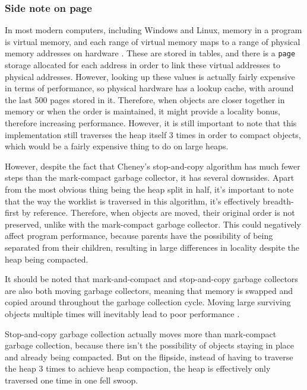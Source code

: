 \documentclass[index]{subfiles}
\begin{document}
\subsubsection{Side note on page}

In most modern computers, including Windows and Linux, memory in a program is virtual memory, and each range of virtual memory maps to a range of physical memory addresses on hardware \cite{code_project}. These are stored in tables, and there is a \verb+page+ storage allocated for each address in order to link these virtual addresses to physical addresses. However, looking up these values is actually fairly expensive in terms of performance, so physical hardware has a lookup cache, with around the last 500 pages stored in it. Therefore, when objects are closer together in memory or when the order is maintained, it might provide a locality bonus, therefore increasing performance. However, it is still important to note that this implementation still traverses the heap itself 3 times in order to compact objects, which would be a fairly expensive thing to do on large heaps.

However, despite the fact that Cheney's stop-and-copy algorithm has much fewer steps than the mark-compact garbage collector, it has several downsides. Apart from the most obvious thing being the heap split in half, it's important to note that the way the worklist is traversed in this algorithm, it's effectively breadth-first by reference. Therefore, when objects are moved, their original order is not preserved, unlike with the mark-compact garbage collector. This could negatively affect program performance, because parents have the possibility of being separated from their children, resulting in large differences in locality despite the heap being compacted.

It should be noted that mark-and-compact and stop-and-copy garbage collectors are also both moving garbage collectors, meaning that memory is swapped and copied around throughout the garbage collection cycle. Moving large surviving objects multiple times will inevitably lead to poor performance \cite[Chapter~4]{gc_handbook}.

Stop-and-copy garbage collection actually moves more than mark-compact garbage collection, because there isn't the possibility of objects staying in place and already being compacted. But on the flipside, instead of having to traverse the heap 3 times to achieve heap compaction, the heap is effectively only traversed one time in one fell swoop.
\end{document}
